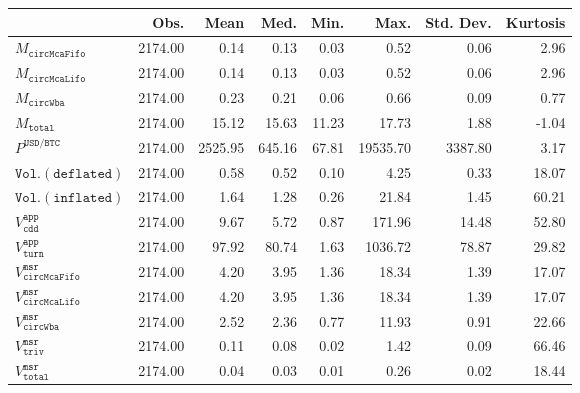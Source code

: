 \begin{tabular}{lrrrrrrr}
  \hline
 & Obs. & Mean & Med. & Min. & Max. & Std. Dev. & Kurtosis \\ 
  \hline
$M_{\mathtt{circMcaFifo}}$ & 2174.00 & 0.14 & 0.13 & 0.03 & 0.52 & 0.06 & 2.96 \\ 
  $M_{\mathtt{circMcaLifo}}$ & 2174.00 & 0.14 & 0.13 & 0.03 & 0.52 & 0.06 & 2.96 \\ 
  $M_{\mathtt{circWba}}$ & 2174.00 & 0.23 & 0.21 & 0.06 & 0.66 & 0.09 & 0.77 \\ 
  $M_{\mathtt{total}}$ & 2174.00 & 15.12 & 15.63 & 11.23 & 17.73 & 1.88 & -1.04 \\ 
  $P^{\mathtt{USD}/\mathtt{BTC}}$ & 2174.00 & 2525.95 & 645.16 & 67.81 & 19535.70 & 3387.80 & 3.17 \\ 
  $\mathtt{Vol.(deflated)}$ & 2174.00 & 0.58 & 0.52 & 0.10 & 4.25 & 0.33 & 18.07 \\ 
  $\mathtt{Vol.(inflated)}$ & 2174.00 & 1.64 & 1.28 & 0.26 & 21.84 & 1.45 & 60.21 \\ 
  $V^{\mathtt{app}}_{\mathtt{cdd}}$ & 2174.00 & 9.67 & 5.72 & 0.87 & 171.96 & 14.48 & 52.80 \\ 
  $V^{\mathtt{app}}_{\mathtt{turn}}$ & 2174.00 & 97.92 & 80.74 & 1.63 & 1036.72 & 78.87 & 29.82 \\ 
  $V^{\mathtt{msr}}_{\mathtt{circMcaFifo}}$ & 2174.00 & 4.20 & 3.95 & 1.36 & 18.34 & 1.39 & 17.07 \\ 
  $V^{\mathtt{msr}}_{\mathtt{circMcaLifo}}$ & 2174.00 & 4.20 & 3.95 & 1.36 & 18.34 & 1.39 & 17.07 \\ 
  $V^{\mathtt{msr}}_{\mathtt{circWba}}$ & 2174.00 & 2.52 & 2.36 & 0.77 & 11.93 & 0.91 & 22.66 \\ 
  $V^{\mathtt{msr}}_{\mathtt{triv}}$ & 2174.00 & 0.11 & 0.08 & 0.02 & 1.42 & 0.09 & 66.46 \\ 
  $V^{\mathtt{msr}}_{\mathtt{total}}$ & 2174.00 & 0.04 & 0.03 & 0.01 & 0.26 & 0.02 & 18.44 \\ 
   \hline
\end{tabular}
